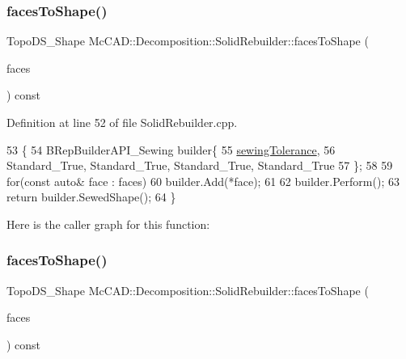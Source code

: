 \subsubsection{\texorpdfstring{faces\+To\+Shape()}{facesToShape()}\hspace{0.1cm}{\footnotesize\ttfamily [1/2]}}
{\footnotesize\ttfamily Topo\+D\+S\+\_\+\+Shape Mc\+C\+A\+D\+::\+Decomposition\+::\+Solid\+Rebuilder\+::faces\+To\+Shape (\begin{DoxyParamCaption}\item[{const std\+::vector$<$ const Topo\+D\+S\+\_\+\+Face $\ast$$>$ \&}]{faces }\end{DoxyParamCaption}) const\hspace{0.3cm}{\ttfamily [private]}}



Definition at line 52 of file Solid\+Rebuilder.\+cpp.


\begin{DoxyCode}
53                                                          \{
54     BRepBuilderAPI\_Sewing builder\{
55         \hyperlink{classMcCAD_1_1Decomposition_1_1SolidRebuilder_a976ffb9b0eef03a646ba42eda6abaeb6}{sewingTolerance},
56         Standard\_True, Standard\_True, Standard\_True, Standard\_True
57     \};
58 
59     \textcolor{keywordflow}{for}(\textcolor{keyword}{const} \textcolor{keyword}{auto}& face : faces)
60         builder.Add(*face);
61 
62     builder.Perform();
63     \textcolor{keywordflow}{return} builder.SewedShape();
64 \}
\end{DoxyCode}
Here is the caller graph for this function\+:
\mbox{\label{classMcCAD_1_1Decomposition_1_1SolidRebuilder_a999dae53070de2c6681c51cfc6a56cd5}} 
\subsubsection{\texorpdfstring{faces\+To\+Shape()}{facesToShape()}\hspace{0.1cm}{\footnotesize\ttfamily [2/2]}}
{\footnotesize\ttfamily Topo\+D\+S\+\_\+\+Shape Mc\+C\+A\+D\+::\+Decomposition\+::\+Solid\+Rebuilder\+::faces\+To\+Shape (\begin{DoxyParamCaption}\item[{const std\+::vector$<$ const Topo\+D\+S\+\_\+\+Face $\ast$$>$ \&}]{faces }\end{DoxyParamCaption}) const\hspace{0.3cm}{\ttfamily [private]}}

